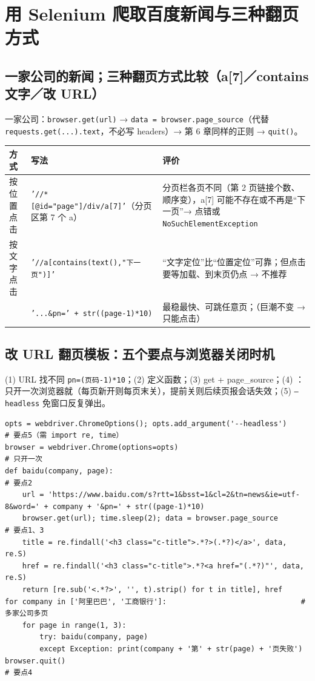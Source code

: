 \section{用 Selenium 爬取百度新闻与三种翻页方式}

\subsection{一家公司的新闻；三种翻页方式比较（a[7]／contains 文字／改 URL）}
一家公司：\texttt{browser.get(url)} → \texttt{data = browser.page\_source}（代替 \texttt{requests.get(...).text}，不必写 headers）→ 第 6 章同样的正则 → \texttt{quit()}。
\begin{tabD07}
\begin{tabularx}{\linewidth}{@{}p{1.6cm}p{5.2cm}L@{}}
\toprule
方式 & 写法 & 评价 \\
\midrule
按位置点击 & \texttt{'//*[@id="page"]/div/a[7]'}（分页区第 7 个 a）& 分页栏各页不同（第 2 页链接个数、顺序变），a[7] 可能不存在或不再是“下一页”→ 点错或 \texttt{NoSuchElementException} \\
按文字点击 & \texttt{'//a[contains(text(),"下一页")]'} & “文字定位”比“位置定位”可靠；但点击要等加载、到末页仍点 → 不推荐 \\
\leavevmode{} & \texttt{'...\&pn=' + str((page-1)*10)} & 最稳最快、可跳任意页；（巨潮不变 → 只能点击）\\
\bottomrule
\end{tabularx}
\end{tabD07}

\subsection{改 URL 翻页模板：五个要点与浏览器关闭时机}
(1) URL 找不同 \texttt{pn=(页码-1)*10}；(2) 定义函数；(3) get + page\_source；(4) ：只开一次浏览器就（每页新开则每页末关），提前关则后续页报会话失效；(5) \texttt{--headless} 免窗口反复弹出。
\begin{lstlisting}[style=pyD07]
opts = webdriver.ChromeOptions(); opts.add_argument('--headless')     # 要点5（需 import re, time）
browser = webdriver.Chrome(options=opts)                              # 只开一次
def baidu(company, page):                                             # 要点2
    url = 'https://www.baidu.com/s?rtt=1&bsst=1&cl=2&tn=news&ie=utf-8&word=' + company + '&pn=' + str((page-1)*10)
    browser.get(url); time.sleep(2); data = browser.page_source        # 要点1、3
    title = re.findall('<h3 class="c-title">.*?>(.*?)</a>', data, re.S)
    href = re.findall('<h3 class="c-title">.*?<a href="(.*?)"', data, re.S)
    return [re.sub('<.*?>', '', t).strip() for t in title], href
for company in ['阿里巴巴', '工商银行']:                               # 多家公司多页
    for page in range(1, 3):
        try: baidu(company, page)
        except Exception: print(company + '第' + str(page) + '页失败')
browser.quit()                                                        # 要点4
\end{lstlisting}

